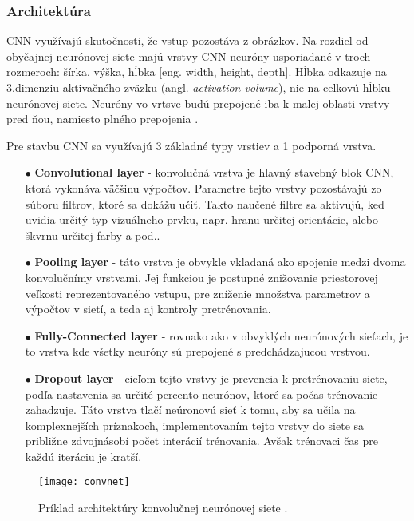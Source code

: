 \subsubsection{Architektúra}
CNN využívajú skutočnosti, že vstup pozostáva z obrázkov.
Na rozdiel od obyčajnej neurónovej siete majú vrstvy CNN neuróny usporiadané v troch rozmeroch: šírka, výška, hĺbka [eng. width, height, depth].
Hĺbka odkazuje na 3.dimenziu aktivačného zväzku (angl. \textit{activation volume}), nie na celkovú hĺbku neurónovej siete.
Neuróny vo vrtsve budú prepojené iba k malej oblasti vrstvy pred ňou, namiesto plného prepojenia \cite{odkaz:CNNArchitecture}.

Pre stavbu CNN sa využívajú 3 základné typy vrstiev a 1 podporná vrstva.
\begin{enumerate}
    \item[$\bullet$] \textbf{Convolutional layer} - konvolučná vrstva je hlavný stavebný blok CNN, ktorá vykonáva väčšinu výpočtov.
    Parametre tejto vrstvy pozostávajú zo súboru filtrov, ktoré sa dokážu učiť.
    Takto naučené filtre sa aktivujú, keď uvidia určitý typ vizuálneho prvku, napr. hranu určitej orientácie, alebo škvrnu určitej farby a pod..
    \item[$\bullet$] \textbf{Pooling layer} - táto vrstva je obvykle vkladaná ako spojenie medzi dvoma konvolučnímy vrstvami.
    Jej funkciou je postupné znižovanie priestorovej veľkosti reprezentovaného vstupu, pre zníženie množstva parametrov a výpočtov v sietí, a teda aj kontroly pretrénovania.
    \item[$\bullet$] \textbf{Fully-Connected layer} - rovnako ako v obvyklých neurónových sieťach, je to vrstva kde všetky neuróny sú prepojené s predchádzajucou vrstvou.
    \item[$\bullet$] \textbf{Dropout layer} - cieľom tejto vrstvy je prevencia k pretrénovaniu siete, podľa nastavenia sa určité percento neurónov, ktoré sa počas trénovanie zahadzuje.
    Táto vrstva tlačí neúronovú sieť k tomu, aby sa učila na komplexnejších príznakoch, implementovaním tejto vrstvy do siete sa približne zdvojnásobí počet interácií trénovania.
    Avšak trénovaci čas pre každú iteráciu je kratší.
\end{enumerate}

\begin{figure}[H]
	\centering
	\texttt{[image: convnet]}
	\caption{Príklad architektúry konvolučnej neurónovej siete \cite{odkaz:CNNArchitecture}.}
	\label{pic:CNNExample}
\end{figure}


